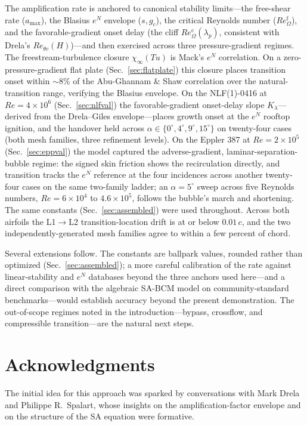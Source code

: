 \documentclass[journal]{new-aiaa}
\begin{document}
The amplification rate is anchored to canonical stability limits---the free-shear
rate ($a_{\max}$), the Blasius $e^N$ envelope ($s,g_c$), the critical Reynolds
number ($Re_\Omega^{\mathrm{f}}$), and the favorable-gradient onset delay (the
cliff $Re_\Omega^{\mathrm{c}}(\lambda_p)$, consistent with Drela's
$Re_{\theta c}(H)$)---and then exercised across three
pressure-gradient regimes. The freestream-turbulence
closure $\chi_\infty(Tu)$ is Mack's $e^N$ correlation. On a zero-pressure-gradient flat plate (Sec.~\ref{sec:flatplate}) this
closure places transition onset within $\sim\!8\%$ of the Abu-Ghannam \& Shaw
correlation over the natural-transition range, verifying the Blasius envelope. On
the NLF(1)-0416 at $Re\!=\!4\!\times\!10^6$ (Sec.~\ref{sec:nlfval}) the
favorable-gradient onset-delay slope $K_\lambda$---derived from the Drela--Giles
envelope---places growth onset at the $e^N$ rooftop ignition, and the
handover held across $\alpha\!\in\!\{0^\circ,4^\circ,9^\circ,15^\circ\}$ on
twenty-four cases (both mesh families, three refinement levels). On the Eppler
387 at
$Re\!=\!2\!\times\!10^5$ (Sec.~\ref{sec:eppval}) the
model captured the adverse-gradient, laminar-separation-bubble regime: the signed
skin friction shows the recirculation directly, and transition tracks the $e^N$
reference at the four incidences across another twenty-four cases on the same
two-family ladder; an $\alpha\!=\!5^\circ$ sweep across five Reynolds numbers,
$Re\!=\!6\!\times\!10^4$ to $4.6\!\times\!10^5$, follows the bubble's march and
shortening. The same constants (Sec.~\ref{sec:assembled}) were used
throughout. Across both airfoils the L1$\to$L2 transition-location drift is at
or below $0.01\,c$, and the two independently-generated mesh families agree to
within a few percent of chord.

Several extensions follow. The constants are ballpark values, rounded rather
than optimized (Sec.~\ref{sec:assembled}); a more careful calibration of the
rate against
linear-stability and $e^N$ databases beyond the three anchors used here---and a
direct comparison with the algebraic SA-BCM model on community-standard
benchmarks---would establish accuracy beyond the present demonstration.
The out-of-scope regimes noted in the introduction---bypass, crossflow, and
compressible transition---are the natural next steps.

\section*{Acknowledgments}
The initial idea for this approach was sparked by conversations with Mark Drela
and Philippe R.\ Spalart, whose insights on the amplification-factor envelope
and on the structure of the SA equation were formative.


\end{document}
